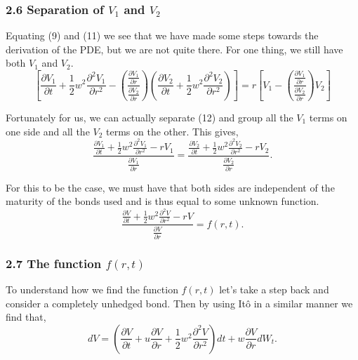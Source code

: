 \documentclass[11pt]{article}
\newcommand\ddfrac[2]{\frac{\displaystyle #1}{\displaystyle #2}}
\begin{document}
\subsubsection*{2.6 Separation of $V_1$ and $V_2$}
Equating (9) and (11) we see that we have made some steps towards the derivation of the PDE, but we are not quite there. For one thing, we still have both $V_1$ and $V_2$. 
\begin{equation}
    \left[ \frac{\partial V_{1}}{\partial t} + \frac{1}{2} w^2 \frac{\partial^2 V_{1}}{\partial r^2} - \left( \ddfrac{\frac{\partial V_{1}}{\partial r}}{\frac{\partial V_{2}}{\partial r}} \right) \left( \frac{\partial V_{2}}{\partial t} + \frac{1}{2} w^2 \frac{\partial^2 V_{2}}{\partial r^2} \right) \right] = r \left[ V_{1} - \left( \ddfrac{\frac{\partial V_{1}}{\partial r}}{\frac{\partial V_{2}}{\partial r}} \right) V_{2} \right]
\end{equation}

Fortunately for us, we can actually separate (12) and group all the $V_1$ terms on one side and all the $V_2$ terms on the other. This gives,
\begin{equation}
    \ddfrac{\frac{\partial V_{1}}{\partial t} + \frac{1}{2} w^2 \frac{\partial^2 V_{1}}{\partial r^2} - rV_{1}}{\frac{\partial V_{1}}{\partial r}} = \ddfrac{\frac{\partial V_{2}}{\partial t} + \frac{1}{2} w^2 \frac{\partial^2 V_{2}}{\partial r^2} - rV_{2}}{\frac{\partial V_{2}}{\partial r}}.
\end{equation}

For this to be the case, we must have that both sides are independent of the maturity of the bonds used and is thus equal to some unknown function.
\begin{equation}
    \ddfrac{\frac{\partial V}{\partial t} + \frac{1}{2} w^2 \frac{\partial^2 V}{\partial r^2} - rV}{\frac{\partial V}{\partial r}} = f(r,t).
\end{equation}

\subsubsection*{2.7 The function $f(r,t)$}
To understand how we find the function $f(r,t)$ let's take a step back and consider a completely unhedged bond. Then by using Itô in a similar manner we find that,
\begin{equation}
    dV = \left( \frac{\partial V}{\partial t} + u \frac{\partial V}{\partial r} + \frac{1}{2} w^2 \frac{\partial^2 V}{\partial r^2} \right) dt + w \frac{\partial V}{\partial r} dW_t. 
\end{equation}
\end{document}
